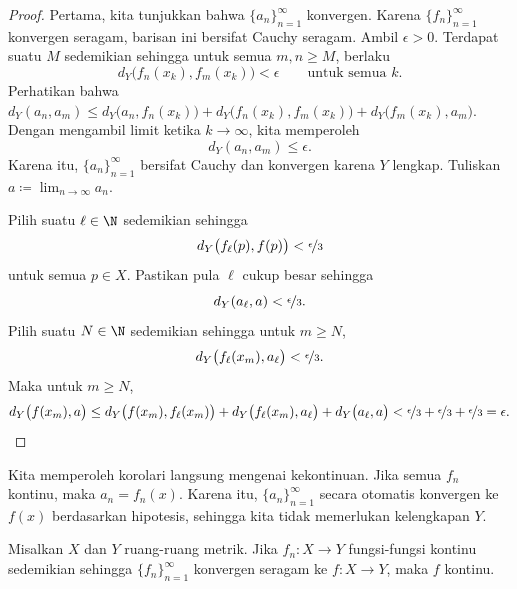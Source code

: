 \begin{proof}
Pertama, kita tunjukkan bahwa $\{ a_n \}_{n=1}^\infty$ konvergen. Karena
$\{ f_n \}_{n=1}^\infty$ konvergen seragam, barisan ini bersifat Cauchy seragam.
Ambil $\epsilon > 0$. Terdapat
suatu $M$ sedemikian sehingga untuk semua $m,n \geq M$, berlaku
\begin{equation*}
d_Y\bigl(f_n(x_k),f_m(x_k)\bigr) < \epsilon \qquad \text{untuk semua } k .
\end{equation*}
Perhatikan bahwa
$d_Y(a_n,a_m) \leq
d_Y\bigl(a_n,f_n(x_k)\bigr) +
d_Y\bigl(f_n(x_k),f_m(x_k)\bigr) +
d_Y\bigl(f_m(x_k),a_m\bigr)$. Dengan mengambil limit ketika $k \to \infty$, kita memperoleh
\begin{equation*}
d_Y(a_n,a_m) \leq \epsilon .
\end{equation*}
Karena itu, $\{a_n\}_{n=1}^\infty$ bersifat Cauchy dan konvergen karena $Y$ lengkap. Tuliskan
$a \coloneqq \lim_{n \to \infty} a_n$.

Pilih suatu $\ell \in \N$ sedemikian sehingga
\begin{equation*}
d_Y\bigl(f_\ell(p),f(p)\bigr) < \nicefrac{\epsilon}{3}
\end{equation*}
untuk semua $p \in X$. Pastikan pula $\ell$ cukup besar
sehingga
\begin{equation*}
d_Y(a_\ell,a) < \nicefrac{\epsilon}{3}  .
\end{equation*}
Pilih suatu $N \in \N$ sedemikian sehingga untuk $m \geq N$,
\begin{equation*}
d_Y\bigl(f_\ell(x_m),a_\ell\bigr) < \nicefrac{\epsilon}{3}  .
\end{equation*}
Maka untuk
$m \geq N$,
\begin{equation*}
d_Y\bigl(f(x_m),a\bigr)
\leq
d_Y\bigl(f(x_m),f_\ell(x_m)\bigr)
+
d_Y\bigl(f_\ell(x_m),a_\ell\bigr)
+
d_Y\bigl(a_\ell,a\bigr)
<
\nicefrac{\epsilon}{3} +
\nicefrac{\epsilon}{3} +
\nicefrac{\epsilon}{3} = \epsilon . \qedhere
\end{equation*}
\end{proof}

Kita memperoleh korolari langsung mengenai kekontinuan.
Jika semua $f_n$ kontinu, maka $a_n = f_n(x)$.
Karena itu,
$\{ a_n \}_{n=1}^\infty$ secara otomatis konvergen ke
$f(x)$ berdasarkan hipotesis, sehingga kita tidak memerlukan kelengkapan $Y$.

\begin{cor} \label{cor:metricuniformcontinuous}
Misalkan $X$ dan $Y$ ruang-ruang metrik.
Jika $f_n \colon X \to Y$ fungsi-fungsi kontinu
sedemikian sehingga
$\{ f_n \}_{n=1}^\infty$ konvergen seragam ke $f \colon X \to Y$,
maka $f$ kontinu.
\end{cor}

